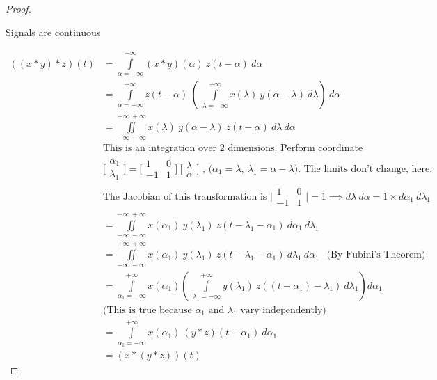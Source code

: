 \begin{proof}
\pagebreak
\begin{case}
Signals are continuous
\end{case}
\begin{align}
 \left((x\ast y)\ast z\right)(t) &= \int\limits_{\alpha=-\infty}^{+\infty}(x\ast y)(\alpha)\ z(t-\alpha)\ d\alpha \\
  &= \int\limits_{\alpha=-\infty}^{+\infty}z(t-\alpha)\ \left(\ \int\limits_{\lambda=-\infty}^{+\infty} x(\lambda)\ y(\alpha-\lambda)\ d\lambda\right)\ d\alpha \nonumber\\
  &= \iint\limits_{-\infty\,-\infty}^{+\infty\,+\infty} x(\lambda)\ y(\alpha-\lambda)\ z(t-\alpha)\ d\lambda\ d\alpha \nonumber\\
  &\text{This is an integration over 2 dimensions. Perform coordinate transformation:} \nonumber\\
  &\text{$\bigl[\begin{smallmatrix} \alpha_1\\ \lambda_1 \end{smallmatrix} \bigr] = \bigl[\begin{smallmatrix} 1&0\\ -1&1 \end{smallmatrix} \bigr]\ \bigl[\begin{smallmatrix} \lambda\\ \alpha \end{smallmatrix} \bigr]$ \ , ($\alpha_1=\lambda ,\ \lambda_1=\alpha -\lambda$). The limits don't change, here.} \nonumber\\
  &\text{The Jacobian of this transformation is $\bigl|\begin{smallmatrix} 1&0\\ -1&1 \end{smallmatrix} \bigr|=1 \implies d\lambda\ d\alpha =1 \times d\alpha_1\ d\lambda_1$} \nonumber\\
  &= \iint\limits_{-\infty\,-\infty}^{+\infty\,+\infty} x(\alpha_1)\ y(\lambda_1)\ z(t-\lambda_1-\alpha_1)\ d\alpha_1\ d\lambda_1 \nonumber\\
  &= \iint\limits_{-\infty\,-\infty}^{+\infty\,+\infty} x(\alpha_1)\ y(\lambda_1)\ z(t-\lambda_1-\alpha_1)\ d\lambda_1\ d\alpha_1\ \ \text{ (By Fubini's Theorem)}\nonumber\\
  &= \int\limits_{\alpha_1=-\infty}^{+\infty} x(\alpha_1)\left(\ \int\limits_{\lambda_1=-\infty}^{+\infty} y(\lambda_1)\ z((t-\alpha_1)-\lambda_1)\ d\lambda_1\right)d\alpha_1 \nonumber\\
  &\text{(This is true because $\alpha_1$ and $\lambda_1$ vary independently)} \nonumber\\
  &= \int\limits_{\alpha_1=-\infty}^{+\infty}x(\alpha_1)\ (y\ast z)(t-\alpha_1)\ d\alpha_1 \nonumber\\
 &= \left(x\ast (y\ast z)\right)(t)
\end{align}
\end{proof}

